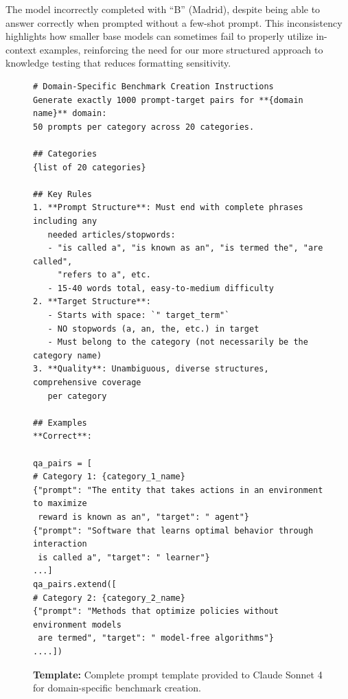 \documentclass[10pt]{article}
\begin{document}
The model incorrectly completed with ``B'' (Madrid), despite being able to answer correctly when prompted without a few-shot prompt. This inconsistency highlights how smaller base models can sometimes fail to properly utilize in-context examples, reinforcing the need for our more structured approach to knowledge testing that reduces formatting sensitivity.




\begin{figure}[t]
\begin{tcolorbox}[colback=gray!5!white, colframe=gray!50!black, title=Benchmark Creation Template]
\small
\begin{verbatim}
# Domain-Specific Benchmark Creation Instructions
Generate exactly 1000 prompt-target pairs for **{domain name}** domain: 
50 prompts per category across 20 categories.

## Categories
{list of 20 categories}
 
## Key Rules
1. **Prompt Structure**: Must end with complete phrases including any 
   needed articles/stopwords:
   - "is called a", "is known as an", "is termed the", "are called", 
     "refers to a", etc.
   - 15-40 words total, easy-to-medium difficulty
2. **Target Structure**: 
   - Starts with space: `" target_term"`
   - NO stopwords (a, an, the, etc.) in target
   - Must belong to the category (not necessarily be the category name)
3. **Quality**: Unambiguous, diverse structures, comprehensive coverage 
   per category

## Examples
**Correct**:

qa_pairs = [
# Category 1: {category_1_name}
{"prompt": "The entity that takes actions in an environment to maximize 
 reward is known as an", "target": " agent"}
{"prompt": "Software that learns optimal behavior through interaction 
 is called a", "target": " learner"} 
...]
qa_pairs.extend([
# Category 2: {category_2_name}
{"prompt": "Methods that optimize policies without environment models 
 are termed", "target": " model-free algorithms"}
....])
\end{verbatim}
\end{tcolorbox}
\caption{\textbf{Template:} Complete prompt template provided to Claude Sonnet 4 for domain-specific benchmark creation.}
\label{app:template}
\end{figure}
\end{document}

